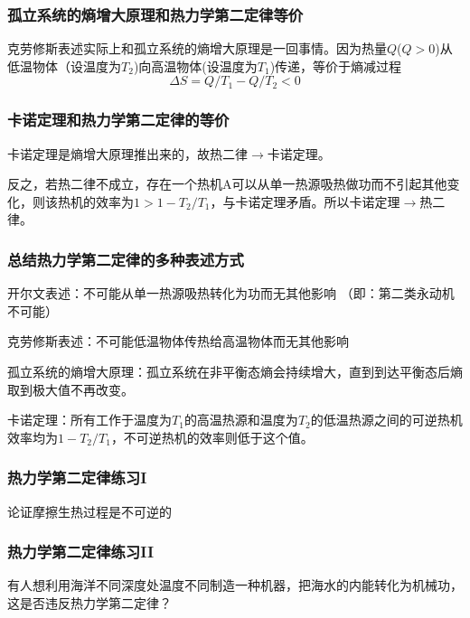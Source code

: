 \documentclass[CJK, 14pt]{beamer}
\begin{document}
\begin{frame}
\frametitle{孤立系统的熵增大原理和热力学第二定律等价}

克劳修斯表述实际上和孤立系统的熵增大原理是一回事情。因为热量$Q$($Q>0$)从低温物体（设温度为$T_2$)向高温物体(设温度为$T_1$)传递，等价于熵减过程
$$\Delta S = Q/T_1 - Q/T_2<0$$

\end{frame}

\begin{frame}
\frametitle{卡诺定理和热力学第二定律的等价}

卡诺定理是熵增大原理推出来的，故热二律$\rightarrow$卡诺定理。

反之，若热二律不成立，存在一个热机A可以从单一热源吸热做功而不引起其他变化，则该热机的效率为$1>1-T_2/T_1$，与卡诺定理矛盾。所以卡诺定理$\rightarrow$热二律。


\end{frame}

\begin{frame}
\frametitle{总结热力学第二定律的多种表述方式}

\bitem
\item{开尔文表述：不可能从单一热源吸热转化为功而无其他影响 （即：第二类永动机不可能）}
\item{克劳修斯表述：不可能低温物体传热给高温物体而无其他影响}
\item{孤立系统的熵增大原理：孤立系统在非平衡态熵会持续增大，直到到达平衡态后熵取到极大值不再改变。}
\item{卡诺定理：所有工作于温度为$T_1$的高温热源和温度为$T_2$的低温热源之间的可逆热机效率均为$1-T_2/T_1$，不可逆热机的效率则低于这个值。}
\eitem

\end{frame}


\begin{frame}
\frametitle{热力学第二定律练习I}



\bitem
\item{论证摩擦生热过程是不可逆的}
\eitem


\end{frame}

\begin{frame}
\frametitle{热力学第二定律练习II}



\bitem
\item{有人想利用海洋不同深度处温度不同制造一种机器，把海水的内能转化为机械功，这是否违反热力学第二定律？}
\eitem


\end{frame}
\end{document}
